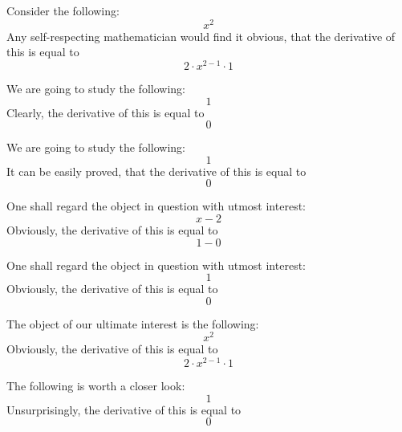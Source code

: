 \documentclass{article}
\begin{document}
Consider the following:
\begin{equation}
x ^{2 } 
\end{equation}
Any self-respecting mathematician would find it obvious, that the derivative of this is equal to
\begin{equation}
2 \cdot x ^{2 - 1 } \cdot 1 
\end{equation}

We are going to study the following:
\begin{equation}
1 
\end{equation}
Clearly, the derivative of this is equal to
\begin{equation}
0 
\end{equation}

We are going to study the following:
\begin{equation}
1 
\end{equation}
It can be easily proved, that the derivative of this is equal to
\begin{equation}
0 
\end{equation}

One shall regard the object in question with utmost interest:
\begin{equation}
x - 2 
\end{equation}
Obviously, the derivative of this is equal to
\begin{equation}
1 - 0 
\end{equation}

One shall regard the object in question with utmost interest:
\begin{equation}
1 
\end{equation}
Obviously, the derivative of this is equal to
\begin{equation}
0 
\end{equation}

The object of our ultimate interest is the following:
\begin{equation}
x ^{2 } 
\end{equation}
Obviously, the derivative of this is equal to
\begin{equation}
2 \cdot x ^{2 - 1 } \cdot 1 
\end{equation}

The following is worth a closer look:
\begin{equation}
1 
\end{equation}
Unsurprisingly, the derivative of this is equal to
\begin{equation}
0 
\end{equation}
\end{document}
